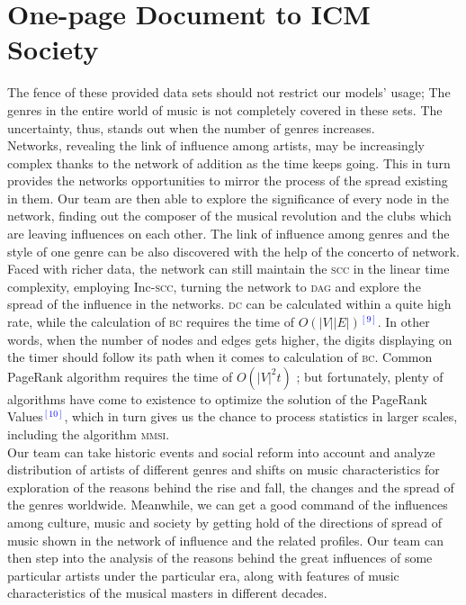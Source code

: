 \documentclass[12pt]{article}
\begin{document}
{\section{One-page Document to ICM Society}
The fence of these provided data sets should not restrict our models' usage; The genres in the entire world of music is not completely covered in these sets. The uncertainty, thus, stands out when the number of genres increases.\\[1ex]
Networks, revealing the link of influence among artists, may be increasingly complex thanks to the network of addition as the time keeps going. This in turn provides the networks opportunities to mirror the process of the spread existing in them. Our team are then able to explore the significance of every node in the network, finding out the composer of the musical revolution and the clubs which are leaving influences on each other. The link of influence among genres and the style of one genre can be also discovered with the help of the concerto of network.\\[1ex]
Faced with richer data, the network can still maintain the \textsc{scc} in the linear time complexity, employing Inc-\textsc{scc}, turning the network to \textsc{dag} and explore the spread of the influence in the networks. \textsc{dc} can be calculated within a quite high rate, while the calculation of \textsc{bc} requires the time of $O(|V||E|)$\textcolor{blue}{$^{[9]}$}. In other words, when the number of nodes and edges gets higher, the digits displaying on the timer should follow its path when it comes to calculation of \textsc{bc}. Common PageRank algorithm requires the time of $O(|V|^{2}t)$ ; but fortunately, plenty of algorithms have come to existence to optimize the solution of the PageRank Values\textcolor{blue}{$^{[10]}$}, which in turn gives us the chance to process statistics in larger scales, including the algorithm \textsc{mmsi}.\\[1ex]
Our team can take historic events and social reform into account and analyze distribution of artists of different genres and shifts on music characteristics for exploration of the reasons behind the rise and fall, the changes and the spread of the genres worldwide. Meanwhile, we can get a good command of the influences among culture, music and society by getting hold of the directions of spread of music shown in the network of influence and the related profiles. Our team can then step into the analysis of the reasons behind the great influences of some particular artists under the particular era, along with features of music characteristics of the musical masters in different decades.\\[1ex]
}
\end{document}
